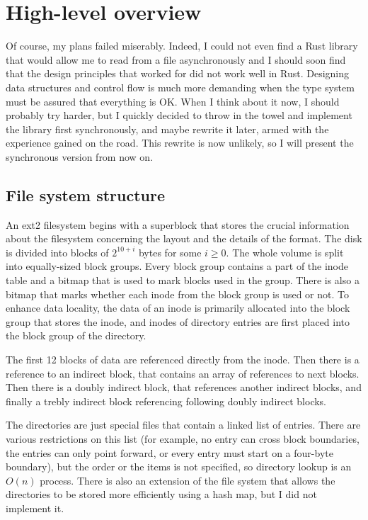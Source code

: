\chapter{High-level overview}

Of course, my plans failed miserably. Indeed, I could not even find a Rust
library that would allow me to read from a file asynchronously and I should soon
find that the design principles that worked for \Cplusplus{} did not work well in
Rust.  Designing data structures and control flow is much more demanding when
the type system must be assured that everything is OK. When I think about it
now, I should probably try harder, but I quickly decided to throw in the towel
and implement the library first synchronously, and maybe rewrite it later, armed
with the experience gained on the road. This rewrite is now unlikely, so I will
present the synchronous version from now on.

\section{File system structure}

An ext2 filesystem \cite{ext2-layout} begins with a superblock that stores the
crucial information about the filesystem concerning the layout and the details
of the format. The disk is divided into blocks of $2^{10+i}$ bytes for some $i
\geq 0$. The whole volume is split into equally-sized block groups. Every block
group contains a part of the inode table and a bitmap that is used to mark
blocks used in the group. There is also a bitmap that marks whether each inode
from the block group is used or not. To enhance data locality, the data of an
inode is primarily allocated into the block group that stores the inode, and
inodes of directory entries are first placed into the block group of the
directory.

The first 12 blocks of data are referenced directly from the inode. Then there
is a reference to an indirect block, that contains an array of references to
next blocks. Then there is a doubly indirect block, that references another
indirect blocks, and finally a trebly indirect block referencing following
doubly indirect blocks.

The directories are just special files that contain a linked list of entries.
There are various restrictions on this list (for example, no entry can cross
block boundaries, the entries can only point forward, or every entry must start
on a four-byte boundary), but the order or the items is not specified, so
directory lookup is an $O(n)$ process. There is also an extension of the
file system that allows the directories to be stored more efficiently using a
hash map, but I did not implement it.

